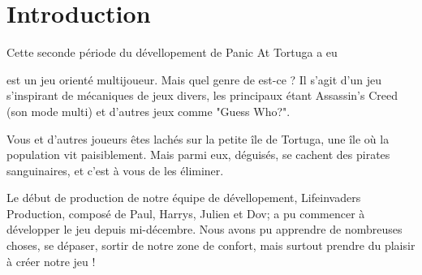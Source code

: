 \documentclass[french, 12pt]{article}
\begin{document}


\tableofcontents
\newpage

\pagestyle{fancy}

\section{Introduction}

Cette seconde période du dévellopement de Panic At Tortuga a eu

est un jeu orienté multijoueur. Mais quel genre de est-ce ?
Il s'agit d'un jeu s'inspirant de mécaniques de jeux divers, 
les principaux étant Assassin's Creed (son mode multi) et d'autres jeux comme "Guess Who?".

Vous et d'autres joueurs êtes lachés sur la petite île de Tortuga, une île où la population vit paisiblement.
Mais parmi eux, déguisés, se cachent des pirates sanguinaires, et c'est à vous de les éliminer.

Le début de production de notre équipe de dévellopement, Lifeinvaders Production,
composé de Paul, Harrys, Julien et Dov; a pu commencer à développer le jeu depuis mi-décembre.
Nous avons pu apprendre de nombreuses choses, se dépaser, sortir de notre zone de confort, mais surtout prendre du plaisir à créer notre jeu !




\end{document}
